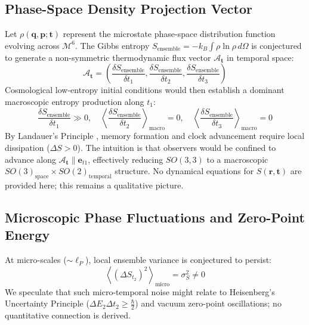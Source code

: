 \documentclass[11pt,a4paper]{article}
\begin{document}
\subsection{Phase-Space Density Projection Vector}
Let $\rho(\mathbf{q}, \mathbf{p}; \mathbf{t})$ represent the microstate phase-space distribution function evolving across $\mathcal{M}^6$. The Gibbs entropy $S_{\text{ensemble}} = -k_B \int \rho \ln \rho \, d\Omega$ is conjectured to generate a non-symmetric thermodynamic flux vector $\mathbf{\mathcal{A}}_{\mathbf{t}}$ in temporal space:
\begin{equation}
\mathbf{\mathcal{A}}_{\mathbf{t}} = \left( \frac{\delta S_{\text{ensemble}}}{\delta t_1}, \frac{\delta S_{\text{ensemble}}}{\delta t_2}, \frac{\delta S_{\text{ensemble}}}{\delta t_3} \right)
\end{equation}
Cosmological low-entropy initial conditions would then establish a dominant macroscopic entropy production along $t_1$:
\begin{equation}
\frac{\delta S_{\text{ensemble}}}{\delta t_1} \gg 0, \quad \left\langle \frac{\delta S_{\text{ensemble}}}{\delta t_2} \right\rangle_{\text{macro}} = 0, \quad \left\langle \frac{\delta S_{\text{ensemble}}}{\delta t_3} \right\rangle_{\text{macro}} = 0
\end{equation}
By Landauer's Principle \cite{Landauer1961}, memory formation and clock advancement require local dissipation ($\Delta S > 0$). The intuition is that observers would be confined to advance along $\mathbf{\mathcal{A}}_{\mathbf{t}} \parallel \mathbf{e}_{t1}$, effectively reducing $SO(3,3)$ to a macroscopic $SO(3)_{\text{space}} \times SO(2)_{\text{temporal}}$ structure. No dynamical equations for $S(\mathbf{r},\mathbf{t})$ are provided here; this remains a qualitative picture.

\subsection{Microscopic Phase Fluctuations and Zero-Point Energy}
At micro-scales ($\sim \ell_P$), local ensemble variance is conjectured to persist:
\begin{equation}
\left\langle \left( \Delta S_{t_2} \right)^2 \right\rangle_{\text{micro}} = \sigma_S^2 \neq 0
\end{equation}
We speculate that such micro-temporal noise might relate to Heisenberg's Uncertainty Principle ($\Delta E_2 \Delta t_2 \ge \frac{\hbar}{2}$) and vacuum zero-point oscillations; no quantitative connection is derived.
\end{document}
